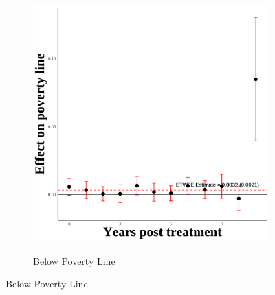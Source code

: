 \documentclass[12pt,english]{article}
\begin{document}
\begin{figure}[H]
\begin{subfigure}[b]{0.3\textwidth}
    \label{fig:snap-secgen-hh}
  \end{subfigure}
  \hfill
  \begin{subfigure}[b]{0.3\textwidth}
    \centering
    \caption{Below Poverty Line}
    \includegraphics[width=\linewidth]{figures/plot31-poverty_line_event_study-secgen-hh.png}
    \label{fig:poverty-line-secgen-hh}
  \end{subfigure}

  \vspace{0.3cm} %


\end{figure}
\end{document}
